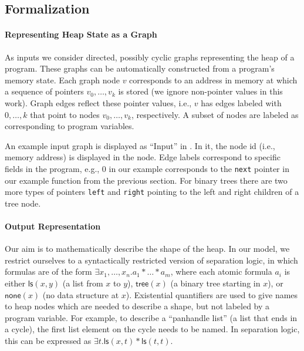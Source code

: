 \documentclass{article} %
\newcommand{\heapGNode}[0]{\ensuremath{v}}
\newcommand{\SLls}[0]{\ensuremath{\mathsf{ls}}}
\newcommand{\SLtree}[0]{\ensuremath{\mathsf{tree}}}
\newcommand{\SLempty}[0]{\ensuremath{\mathsf{none}}}
\begin{document}
\subsection{Formalization}

\paragraph{Representing Heap State as a Graph}
%
As inputs we consider directed, possibly cyclic graphs representing the heap of
a program. These graphs can be automatically constructed from a program's memory
state.
Each graph node $\heapGNode$ corresponds to an address in memory at which a
sequence of pointers $\heapGNode_0, \ldots, \heapGNode_k$ is stored (we ignore
non-pointer values in this work).
Graph edges reflect these pointer values, i.e., $\heapGNode$ has edges 
labeled with $0, \ldots, k$  that point to nodes $\heapGNode_0, \ldots,
\heapGNode_k$, respectively.
A subset of nodes are labeled as corresponding to program variables.

An example input graph is displayed as ``Input'' in .
In it, the node id (i.e., memory address) is displayed in the node.
Edge labels correspond to specific fields in the program, e.g., $0$ in our
example corresponds to the \texttt{next} pointer in our example function from
the previous section. For binary trees there are two more types
of pointers \texttt{left} and \texttt{right} pointing to the left and right
children of a tree node.



\paragraph{Output Representation}
%
Our aim is to mathematically describe the shape of the heap.
In our model, we restrict ourselves to a syntactically restricted version of
separation logic, in which formulas are of the form
 $\exists x_1, \ldots, x_n . a_1 \ast \ldots \ast a_m$,
where each atomic formula $a_i$ is either $\SLls(x, y)$ (a list from $x$ to $y$),
$\SLtree(x)$ (a binary tree starting in $x$), or $\SLempty(x)$ (no data
structure at $x$).
Existential quantifiers are used to give names to heap nodes which are
needed to describe a shape, but not labeled by a program variable.
For example, to describe a ``panhandle list'' (a list that ends in a
cycle), the first list element on the cycle needs to be named.
In separation logic, this can be expressed as $\exists t . \SLls(x, t)
\ast \SLls(t, t)$.
\end{document}
